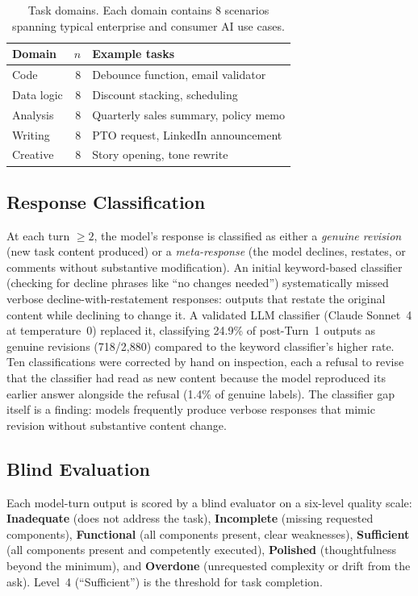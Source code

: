 \begin{table}[t]
\centering
\small
\begin{tabular}{@{}lrl@{}}
\toprule
\textbf{Domain} & \textbf{$n$} & \textbf{Example tasks} \\
\midrule
Code & 8 & Debounce function, email validator \\
Data logic & 8 & Discount stacking, scheduling \\
Analysis & 8 & Quarterly sales summary, policy memo \\
Writing & 8 & PTO request, LinkedIn announcement \\
Creative & 8 & Story opening, tone rewrite \\
\bottomrule
\end{tabular}
\caption{Task domains. Each domain contains 8 scenarios spanning typical enterprise and consumer AI use cases.}
\label{tab:s3-domains}
\end{table}

\subsection{Response Classification}
\label{sec:methods-classifier}

At each turn $\geq 2$, the model's response is classified as either a \textit{genuine revision} (new task content produced) or a \textit{meta-response} (the model declines, restates, or comments without substantive modification). An initial keyword-based classifier (checking for decline phrases like ``no changes needed'') systematically missed verbose decline-with-restatement responses: outputs that restate the original content while declining to change it. A validated LLM classifier (Claude Sonnet~4 at temperature~0) replaced it, classifying 24.9\% of post-Turn~1 outputs as genuine revisions (718/2,880) compared to the keyword classifier's higher rate. Ten classifications were corrected by hand on inspection, each a refusal to revise that the classifier had read as new content because the model reproduced its earlier answer alongside the refusal (1.4\% of genuine labels). The classifier gap itself is a finding: models frequently produce verbose responses that mimic revision without substantive content change.

\subsection{Blind Evaluation}

Each model-turn output is scored by a blind evaluator on a six-level quality scale:
\textbf{Inadequate} (does not address the task), \textbf{Incomplete} (missing
requested components), \textbf{Functional} (all components present, clear weaknesses),
\textbf{Sufficient} (all components present and competently executed), \textbf{Polished}
(thoughtfulness beyond the minimum), and \textbf{Overdone} (unrequested complexity or drift
from the ask).
Level~4 (``Sufficient'') is the threshold for task completion.

